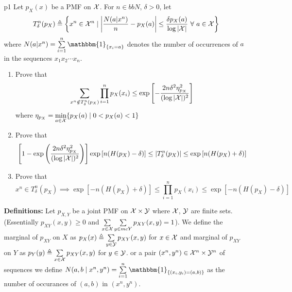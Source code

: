 \documentclass[a4paper, 11pt]{article}
\begin{document}
	
	
	\begin{problem}{%
	}{p1%
	}
	Let $p_X(x)$ be a PMF on $\mathcal{X}$. For $n\in bbN$, $\delta>0$, let $$T_{\delta}^n(p_X)\triangleq \left\{ x^n\in \mathcal{X}^n\mid  \left| \frac{N(a|x^n)}{n}-p_X(a) \right| \leq \frac{\delta p_X(a)}{\log |\mathcal{X}|}\ \forall \ a\in \mathcal{X} \right\}$$ where $N(a|x^n)=\sum\limits_{i=1}^n\mathbbm{1}_{\{x_i=a\}}$ denotes the number of occurrences of $a$ in the sequences $x_1x_2\cdots x_n$.
	\begin{enumerate}
		\item Prove that $$\sum_{x^n\notin T_{\delta}^n(p_X)} \prod_{i=1}^n p_X(x_i)\leq \exp \left[ -\frac{2n\delta^2\eta^2_{p_X}}{(\log |\mathcal{X}|)^2} \right]$$ where $\eta_{p_X}=\min\limits_{a\in \mathcal{X}}\{p_X(a)\mid 0<p_X(a)<1\}$
		\item Prove that $$\left[1-   \exp \left( \frac{2n\delta^2\eta^2_{p_X}}{(\log |\mathcal{X}|)^2}  \right) \right] \exp\left[  n(H(p_X)-\delta)\right]\leq |T_{\delta}^n(p_X)|\leq \exp\left[n(H(p_X)+\delta)\right] $$
		\item Prove that $$x^n\in T_{\delta}^n(p_X)\implies \exp[-n(H(p_X)+\delta)]\leq \prod_{i=1}^np_X(x_i)\leq \exp[-n(H(p_X)-\delta)]$$
	\end{enumerate}
\end{problem}

\solve{
}

 \parinf \textbf{Definitions:} Let $p_{X,Y}$ be a joint PMF on $\mathcal{X}\times \mathcal{Y}$ where $\mathcal{X}$, $\mathcal{Y}$ are finite sets. (Essentially $p_{XY}(x,y)\geq 0$ and $\sum\limits_{x\in \mathcal{X}}\sum\limits_{y\in mcY}p_{XY}(x,y)=1$). We define the marginal of $p_{XY}$ on $X$ as $p_X(x)\triangleq \sum\limits_{y\in \mathcal{Y}}p_{XY}(x,y)$ for $x\in \mathcal{X}$ and marginal of $p_{XY}$ on $Y$ as $p_Y(y)\triangleq \sum\limits_{x\in \mathcal{X}}p_{XY}(x,y)$ for $y\in \mathcal{Y}$. 
\parinn 
 or a pair $(x^n,y^n)\in \mathcal{X}^n\times \mathcal{Y}^n$ of sequences we define $N(a,b\mid x^n,y^n)=\sum\limits_{i=1}^n\mathbbm{1}_{\{(x_i,y_i)=(a,b)\}}$ as the number of occurances of $(a,b)$ in $(x^n,y^n)$. 
 
\end{document}
